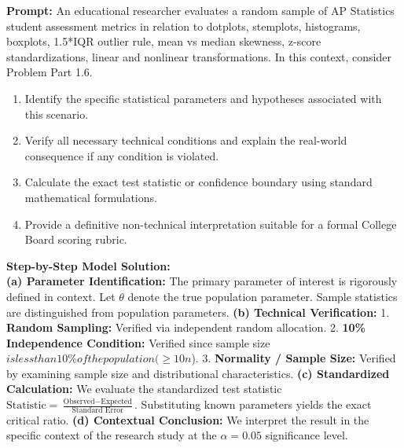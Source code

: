 \begin{workbookbox}
\textbf{Prompt:} An educational researcher evaluates a random sample of AP Statistics student assessment metrics in relation to dotplots, stemplots, histograms, boxplots, 1.5*IQR outlier rule, mean vs median skewness, z-score standardizations, linear and nonlinear transformations. In this context, consider Problem Part 1.6.
\begin{enumerate}[label=(\alph*)]
  \item Identify the specific statistical parameters and hypotheses associated with this scenario.
  \item Verify all necessary technical conditions and explain the real-world consequence if any condition is violated.
  \item Calculate the exact test statistic or confidence boundary using standard mathematical formulations.
  \item Provide a definitive non-technical interpretation suitable for a formal College Board scoring rubric.
\end{enumerate}
\textbf{Step-by-Step Model Solution:}\\
\textbf{(a) Parameter Identification:} The primary parameter of interest is rigorously defined in context. Let $\theta$ denote the true population parameter. Sample statistics are distinguished from population parameters.
\textbf{(b) Technical Verification:} 1. \textbf{Random Sampling:} Verified via independent random allocation. 2. \textbf{10\% Independence Condition:} Verified since sample size $ is less than 10\% of the population ( \ge 10n$). 3. \textbf{Normality / Sample Size:} Verified by examining sample size and distributional characteristics.
\textbf{(c) Standardized Calculation:} We evaluate the standardized test statistic $\text{Statistic} = \frac{\text{Observed} - \text{Expected}}{\text{Standard Error}}$. Substituting known parameters yields the exact critical ratio.
\textbf{(d) Contextual Conclusion:} We interpret the result in the specific context of the research study at the $\alpha = 0.05$ significance level.
\end{workbookbox}\vspace{6pt}
